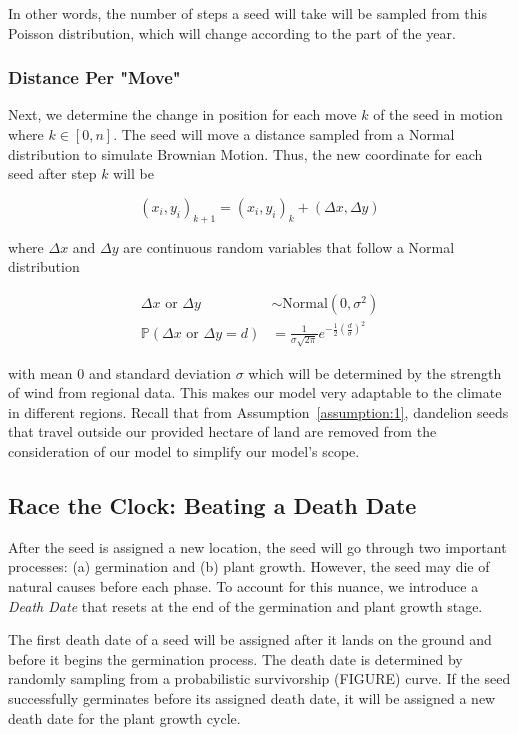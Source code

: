     In other words, the number of steps a seed will take will be sampled from this Poisson distribution, which will change according to the part of the year. 

\subsubsection{Distance Per "Move"}

    Next, we determine the change in position for each move \(k\) of the seed in motion where \(k \in [0, n]\). The seed will move a distance sampled from a Normal distribution to simulate Brownian Motion. Thus, the new coordinate for each seed after step \(k\) will be 

    \begin{equation}
        (x_i, y_i)_{k+1} = (x_i, y_i)_k + (\Delta x, \Delta y)
    \end{equation}

    where \(\Delta x\) and \(\Delta y\) are continuous random variables that follow a Normal distribution

    \begin{align}
        \Delta x \text{ or } \Delta y & \sim \text{Normal}(0, \sigma^2) \\
        \mathbb{P}(\Delta x \text{ or } \Delta y = d) & = \frac{1}{\sigma \sqrt{2\pi}}e^{-\frac{1}{2}\left( \frac{d}{\sigma}\right)^2}
    \end{align}

with mean 0 and standard deviation \(\sigma\) which will be determined by the strength of wind from regional data. This makes our model very adaptable to the climate in different regions. Recall that from Assumption~\ref{assumption:1}, dandelion seeds that travel outside our provided hectare of land are removed from the consideration of our model to simplify our model's scope.

\subsection{Race the Clock: Beating a Death Date}
After the seed is assigned a new location, the seed will go through two important processes: (a) germination and (b) plant growth. However, the seed may die of natural causes before each phase. To account for this nuance, we introduce a \textit{Death Date} that resets at the end of the germination and plant growth stage. 

The first death date of a seed will be assigned after it lands on the ground and before it begins the germination process. The death date is determined by randomly sampling from a probabilistic survivorship (FIGURE) curve. If the seed successfully germinates before its assigned death date, it will be assigned a new death date for the plant growth cycle. 

